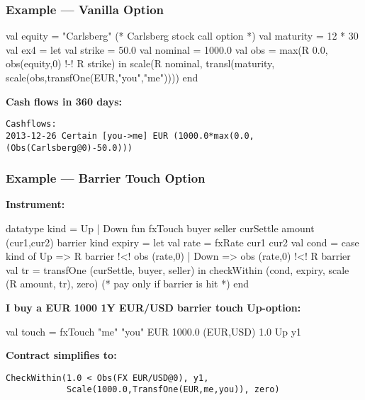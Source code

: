 \documentclass[xcolor=dvipsnames,11pt]{beamer}
\begin{document}
\begin{frame}[fragile,t]\frametitle{Example --- Vanilla Option}

\begin{mlcode}
val equity = "Carlsberg"  (* Carlsberg stock call option *)
val maturity = 12 * 30
val ex4 =
    let val strike = 50.0
        val nominal = 1000.0
        val obs = max(R 0.0, obs(equity,0) !-! R strike)
    in scale(R nominal,
             transl(maturity,
                    scale(obs,transfOne(EUR,"you","me"))))
    end
\end{mlcode}

\textbf{Cash flows in 360 days:}

\begin{scriptsize}
\begin{verbatim}
Cashflows:
2013-12-26 Certain [you->me] EUR (1000.0*max(0.0,(Obs(Carlsberg@0)-50.0)))
\end{verbatim}
\end{scriptsize}
\end{frame}

\begin{frame}[fragile,t]\frametitle{Example --- Barrier Touch Option}
\textbf{Instrument:}
\begin{mlcode}
datatype kind = Up | Down
fun fxTouch buyer seller curSettle amount
                   (cur1,cur2) barrier kind expiry =
  let val rate = fxRate cur1 cur2
      val cond = case kind of
                    Up   => R barrier !<! obs (rate,0)
                  | Down => obs (rate,0) !<! R barrier
      val tr   = transfOne (curSettle, buyer, seller)
  in checkWithin (cond, expiry,
                  scale (R amount, tr),
                  zero)    (* pay only if barrier is hit *)
  end
\end{mlcode}

\textbf{I buy a EUR 1000 1Y EUR/USD barrier touch Up-option:}
\begin{mlcode}
val touch =
 fxTouch "me" "you" EUR 1000.0 (EUR,USD) 1.0 Up y1
\end{mlcode}

\textbf{Contract simplifies to:}
\begin{scriptsize}
\begin{verbatim}
CheckWithin(1.0 < Obs(FX EUR/USD@0), y1, 
            Scale(1000.0,TransfOne(EUR,me,you)), zero)
\end{verbatim}
\end{scriptsize}
\end{frame}
\end{document}

